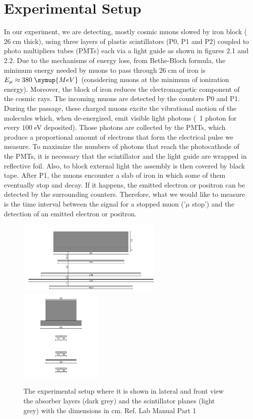 \chapter{Experimental Setup}
\label{sec:setup}
	In our experiment, we are detecting, mostly cosmic muons slowed by iron block ($26\;$cm thick),
	using three layers of plastic scintillators (P0, P1 and P2) coupled to photo multipliers tubes (PMTs) each via a light guide as shown in figures 2.1 and 2.2.
	Due to the mechanisms of energy loss, from Bethe-Bloch formula, the minimum energy needed by muons to pass through 
	$26\;$cm of iron is $E_{\mu} \approx 380 \; \symup{MeV}$ (considering muons at the minimum of ionization energy).
	 Moreover, the block of iron reduces the electromagnetic component of the cosmic rays.
	The incoming muons are detected by the counters P0 and P1.
	During the passage, these charged muons excite the vibrational motion of the molecules which, when de-energized, 
	emit visible light photons  (~1 photon for every $100\;$eV deposited). Those photons are collected by the PMTs, which
	produce a proportional amount of electrons that form the electrical pulse we measure.
	To maximize the numbers of photons that reach the photocathode of the PMTs, it is 
	necessary that the scintillator and the light guide are wrapped in reflective foil. Also, to block
	external light the assembly is then covered by black tape.
	After P1, the muons encounter a slab of iron in which some of them eventually stop and decay. If it happens,
	the emitted electron or positron can be detected by the surrounding counters. Therefore,
	what we would like to measure is the time interval between the signal for a stopped muon (’$\mu$ stop’) and the
	detection of an emitted electron or positron.
	\begin{figure}
		\centering
		\includegraphics[width=0.63\textwidth]{figures/11.png}
		\includegraphics[width=0.36\textwidth]{figures/22.png}
		\caption{The experimental setup where it is shown in lateral and front view the absorber layers (dark grey) and the scintillator planes (light grey) with the dimensions in cm. Ref. Lab Manual Part 1}
		\label{fig:Scintillators_Detectors}
	\end{figure}
